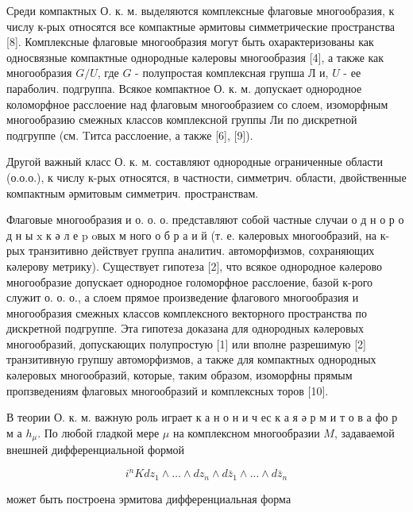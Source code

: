\documentclass[10pt]{article}
\begin{document}
Среди компактных О. к. м. выделяются комплексные флаговые многообразия, к числу к-рых относятся все компактные әрмитовы симметрические пространства [8]. Комплексные флаговые многообразия могут быть охарактеризованы как односвязные компактные однородные кәлеровы многообразия [4], а также как многообразия $G / U$, где $G$ - полупростая комплексная групша Л и, $U$ - ее параболич. подгруппа. Всякое компактное О. к. м. допускает однородное коломорфное расслоение над флаговым многообразием со слоем, изоморфным многообразию смежных классов комплексной группы Ли по дискретной подгруппе (см. Tитса расслоение, а также [6], [9]).



Другой важный класс О. к. м. составляют однородные ограниченные области (о.о.о.), к числу к-рых относятся, в частности, симметрич. области, двойственные компактным әрмитовым симметрич. пространствам.



Флаговые многообразия и о. о. о. представляют собой частные случаи о д н о р о д н ы $\mathrm{x}$ к ә л е p oвых м ного о б р а и й (т. е. кәлеровых многообразий, на к-рых транзитивно действует группа аналитич. автоморфизмов, сохраняющих кәлерову метрику). Существует гипотеза [2], что всякое однородное кәлерово многообразие допускает однородное голоморфное расслоение, базой к-рого служит о. о. о., а слоем прямое произведение флагового многообразия и многообразия смежных классов комплексного векторного пространства по дискретной подгруппе. Эта гипотеза доказана для однородных кәлеровых многообразий, допускающих полупростую [1] или вполне разрешимую [2] транзитивную групшу автоморфизмов, а также для компактных однородных кәлеровых многообразий, которые, таким образом, изоморфны прямым пропзведениям флаговых многообразий и комплексных торов [10].



В теории О. к. м. важную роль играет к а н о н и ч ес к а я ә р м и т о в а фо р м а $h_{\mu}$. По любой гладкой мере $\mu$ на комплексном многообразии $M$, задаваемой внешней дифференциальной формой



\[

i^{n} K d z_{1} \wedge \ldots \wedge d z_{n} \wedge d \bar{z}_{1} \wedge \ldots \wedge d \bar{z}_{n}

\]



может быть построена эрмитова дифференциальная форма
\end{document}
